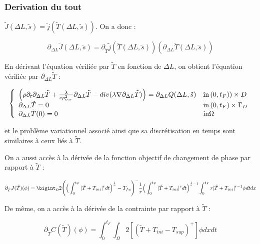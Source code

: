 \documentclass[11pt,a4paper]{article}
\begin{document}
\subsubsection*{Derivation du tout}

$\tilde{J}(\Delta L,\tilde{s})=\tilde{j}(\tilde{T}(\Delta L,\tilde{s}))$. On a donc :

\begin{equation}
\partial_{\Delta L}\tilde{J}(\Delta L,\tilde{s})=\partial_{\tilde{T}}\tilde{j}(\tilde{T}(\Delta L,\tilde{s}))(\partial_{\Delta L}\tilde{T}(\Delta L,\tilde{s}))
\end{equation}

En dérivant l'équation vérifiée par $\tilde{T}$ en fonction de $\Delta L$, on obtient l'équation vérifiée par $\partial_{\Delta L}\tilde{T}$ :

\begin{equation}
\label{eq:ChaleurDerTilde}
\left\{\begin{array}{ll}
	\Big(\rho\partial_t \partial_{\Delta L}\tilde{T}+\frac{\lambda}{ep_{car}^2} \partial_{\Delta L}\tilde{T}-div(\lambda\nabla \partial_{\Delta L}\tilde{T})\Big)=\partial_{\Delta L}Q(\Delta L,\tilde{s})& \textrm{in\,}(0,t_F))\times D \\
	\partial_{\Delta L}\tilde{T}=0 & \textrm{in\,}(0,t_F)\times \Gamma_D \\
	\partial_{\Delta L}\tilde{T}(0)=0 & \textrm{in} \Omega
\end{array}\right.
\end{equation}

et le problème variationnel associé ainsi que sa discrétisation en temps sont similaires à ceux liés à $\tilde{T}$.

On a aussi accès à la dérivée de la fonction objectif de changement de phase par rapport à $\tilde{T}$ :

\begin{equation}
\partial_{\tilde{T}}J(\tilde{T})(\phi)= \bigint_{\Omega}2\Bigg(\Big(\int_{0}^{t_F}|\tilde{T}+T_{ini}|^rdt\Big)^{\frac{1}{r}}-T_{fu}\Bigg)^-\frac{1}{r}\Big(\int_{0}^{t_F}|\tilde{T}+T_{ini}|^rdt\Big)^{\frac{1}{r}-1}\int_{0}^{t_F}r|\tilde{T}+T_{ini}|^{r-1}\phi dtdx 
\end{equation}

De même, on a accès à la dérivée de la contrainte par rapport à $\tilde{T}$ :

\begin{equation}
\partial_{\tilde{T}}C(\tilde{T})(\phi)= \int_{0}^{t_F}\int_{\Omega}2[(\tilde{T}+T_{ini}-T_{sup})^+]\phi dxdt
\end{equation}
\end{document}
